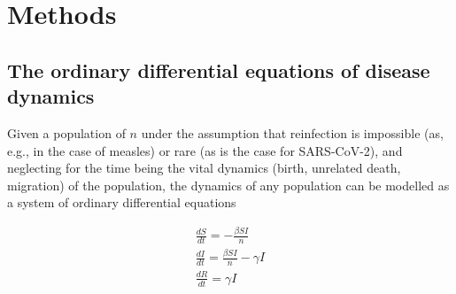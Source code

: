 \documentclass{article}
\begin{document}

\section{Methods} %
\label{sec:methods}

\subsection{The ordinary differential equations of disease dynamics} %
\label{sub:the_ordinary_differential_equations_of_disease_dynamics}

Given a population of $n$ under the assumption that reinfection is impossible (as, e.g., in the case of measles) or rare (as is the case for SARS-CoV-2\cite{edridge2020human,deng2020primary,bao2020reinfection}), and neglecting for the time being the vital dynamics (birth, unrelated death, migration) of the population, the dynamics of any population can be modelled as a system of ordinary differential equations

\begin{equation}
	\begin{aligned}
		\frac{dS}{dt} = - \frac{\beta S I}{n} 								\\
		\frac{dI}{dt} = \frac{\beta S I}{n} - \gamma I 						\\
		\frac{dR}{dt} = \gamma I
	\end{aligned}
	\label{eq:sir_equation}
\end{equation}
\end{document}
